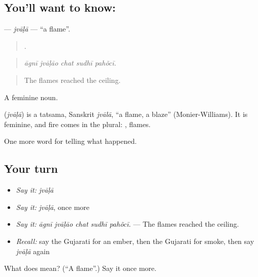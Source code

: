 \subsection*{You'll want to know: }
\textbf{} — \emph{jvāḷā} — \textquotedblleft{}a flame\textquotedblright{}.

\begin{quote}
    .
\end{quote}

\begin{quote}
\emph{āgnī jvāḷāo chat sudhī pahõcī.}
\end{quote}

\begin{quote}
The flames reached the ceiling.
\end{quote}

A feminine noun.

\begin{cousinweb}
\textbf{} (\emph{jvāḷā}) is a tatsama, Sanskrit \emph{jvālā}, \textquotedblleft{}a flame, a blaze\textquotedblright{} (Monier-Williams). It is feminine, and fire comes in the plural: \textbf{}, flames.
\end{cousinweb}

\begin{grammarlens}[title={What you've built}]
One more word for telling what happened.
\end{grammarlens}

\subsection*{Your turn}
\begin{itemize}
\raggedright
  \item \emph{Say it:} \emph{jvāḷā}
  \item \emph{Say it:} \emph{jvāḷā}, once more
  \item \emph{Say it:} \emph{āgnī jvāḷāo chat sudhī pahõcī.} — The flames reached the ceiling.
  \item \emph{Recall:} say the Gujarati for an ember, then the Gujarati for smoke, then say \emph{jvāḷā} again
\end{itemize}

\begin{tcolorbox}[breakable,colback=teal!4,colframe=teal!35!black,title={Before you move on}]
What does  mean? (\textquotedblleft{}A flame\textquotedblright{}.) Say it once more.
\end{tcolorbox}
